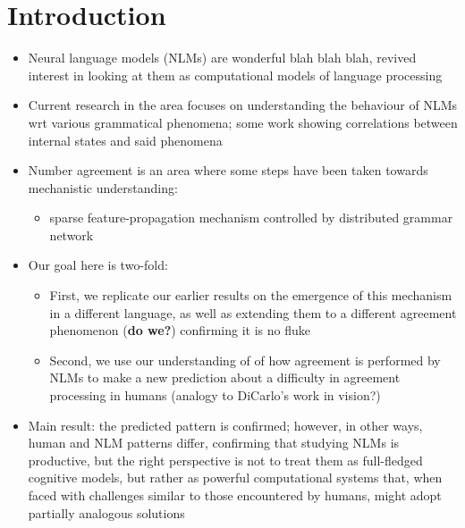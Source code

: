 \section{Introduction}

% 

\begin{itemize}
\item Neural language models (NLMs) are wonderful blah blah blah, revived interest in
  looking at them as computational models of language processing
\item Current research in the area focuses on understanding the behaviour of NLMs wrt
  various grammatical phenomena; some work showing correlations
  between internal states and said phenomena
\item Number agreement is an area where some steps have been taken
  towards mechanistic understanding:
  \begin{itemize}
  \item sparse feature-propagation mechanism controlled by distributed
    grammar network
  \end{itemize}
\item Our goal here is two-fold:
  \begin{itemize}
  \item First, we replicate our earlier results on the emergence of
    this mechanism in a different language, as well as extending them to a different
    agreement phenomenon (\textbf{do we?}) confirming it is no fluke
  \item Second, we use our understanding of of how agreement is
    performed by NLMs to make a new prediction about a difficulty in agreement
    processing in humans (analogy to DiCarlo's work in vision?)
  \end{itemize}
\item Main result: the predicted pattern is confirmed; however, in other ways,
  human and NLM patterns differ, confirming that studying NLMs is
  productive, but the right perspective is not to treat them as
  full-fledged cognitive models, but rather as powerful computational
  systems that, when faced with challenges similar to those
  encountered by humans, might adopt partially analogous solutions
\end{itemize}
